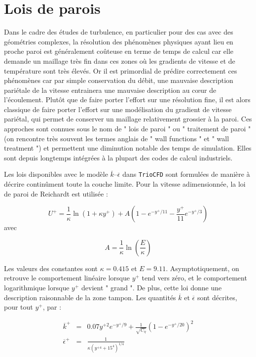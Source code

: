 \chapter{Lois de parois}
Dans le cadre des \'etudes de turbulence, en particulier pour des cas
avec des g\'eom\'etries complexes, la r\'esolution des ph\'enom\`enes physiques
ayant lieu en proche paroi est g\'en\'eralement co\^uteuse en terme de temps
de calcul car elle demande un maillage tr\`es fin dans ces zones o\`u
les gradients de vitesse et de temp\'erature sont tr\`es \'elev\'es. Or il
est primordial de pr\'edire correctement ces ph\'enom\`enes car par simple
conservation du d\'ebit, une mauvaise description pari\'etale de la vitesse
entrainera une mauvaise description au c\oe ur de l\textquoteright \'ecoulement.
Plut\^ot que de faire porter l\textquoteright effort sur une r\'esolution
fine, il est alors classique de faire porter l\textquoteright effort
sur une mod\'elisation du gradient de vitesse pari\'etal, qui permet de
conserver un maillage relativement grossier \`a la paroi. Ces approches
sont connues sous le nom de " lois de paroi " ou " traitement de paroi
" (on rencontre tr\`es souvent les termes anglais de " wall functions
" et " wall treatment ") et permettent une diminution notable des
temps de simulation. Elles sont depuis longtemps int\'egr\'ees \`a la plupart
des codes de calcul industriels.

Les lois disponibles avec le mod\`ele $\overline{k}$--$\overline{\epsilon}$
dans \texttt{TrioCFD} sont formul\'ees de mani\`ere \`a d\'ecrire contin\^ument
toute la couche limite. Pour la vitesse adimensionn\'ee, la loi de paroi
de Reichardt est utilis\'ee \cite{Reichardt1940} :

\[
U^{+}=\frac{1}{\kappa}\ln(1+\kappa y^{+})+A\left(1-e^{-y^{+}/11}-\frac{y^{+}}{11}e^{-y^{+}/3}\right)
\]
avec

\[
A=\frac{1}{\kappa}\ln\left(\frac{E}{\kappa}\right)
\]


Les valeurs des constantes sont $\kappa=0.415$ et $E=9.11$. Asymptotiquement,
on retrouve le comportement lin\'eaire lorsque $y^{+}$ tend vers z\'ero,
et le comportement logarithmique lorsque $y^{+}$ devient " grand
". De plus, cette loi donne une description raisonnable de la zone
tampon. Les quantit\'es $\overline{k}$ et $\overline{\epsilon}$ sont
d\'ecrites, pour tout $y^{+}$, par :

\begin{eqnarray*}
\overline{k}^{+} & = & 0.07y^{+2}e^{-y^{+}/9}+\frac{1}{\sqrt{C_{\eta}}}\left(1-e^{-y^{+}/20}\right)^{2}\\
\overline{\epsilon}^{+} & = & \frac{1}{\kappa(y^{+4}+15^{4})^{1/4}}
\end{eqnarray*}



